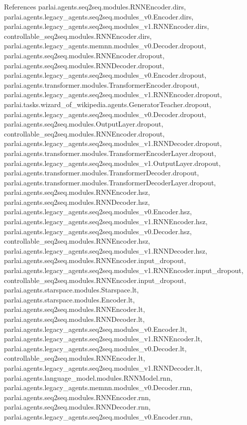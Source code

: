References parlai.\+agents.\+seq2seq.\+modules.\+R\+N\+N\+Encoder.\+dirs, parlai.\+agents.\+legacy\+\_\+agents.\+seq2seq.\+modules\+\_\+v0.\+Encoder.\+dirs, parlai.\+agents.\+legacy\+\_\+agents.\+seq2seq.\+modules\+\_\+v1.\+R\+N\+N\+Encoder.\+dirs, controllable\+\_\+seq2seq.\+modules.\+R\+N\+N\+Encoder.\+dirs, parlai.\+agents.\+legacy\+\_\+agents.\+memnn.\+modules\+\_\+v0.\+Decoder.\+dropout, parlai.\+agents.\+seq2seq.\+modules.\+R\+N\+N\+Encoder.\+dropout, parlai.\+agents.\+seq2seq.\+modules.\+R\+N\+N\+Decoder.\+dropout, parlai.\+agents.\+legacy\+\_\+agents.\+seq2seq.\+modules\+\_\+v0.\+Encoder.\+dropout, parlai.\+agents.\+transformer.\+modules.\+Transformer\+Encoder.\+dropout, parlai.\+agents.\+legacy\+\_\+agents.\+seq2seq.\+modules\+\_\+v1.\+R\+N\+N\+Encoder.\+dropout, parlai.\+tasks.\+wizard\+\_\+of\+\_\+wikipedia.\+agents.\+Generator\+Teacher.\+dropout, parlai.\+agents.\+legacy\+\_\+agents.\+seq2seq.\+modules\+\_\+v0.\+Decoder.\+dropout, parlai.\+agents.\+seq2seq.\+modules.\+Output\+Layer.\+dropout, controllable\+\_\+seq2seq.\+modules.\+R\+N\+N\+Encoder.\+dropout, parlai.\+agents.\+legacy\+\_\+agents.\+seq2seq.\+modules\+\_\+v1.\+R\+N\+N\+Decoder.\+dropout, parlai.\+agents.\+transformer.\+modules.\+Transformer\+Encoder\+Layer.\+dropout, parlai.\+agents.\+legacy\+\_\+agents.\+seq2seq.\+modules\+\_\+v1.\+Output\+Layer.\+dropout, parlai.\+agents.\+transformer.\+modules.\+Transformer\+Decoder.\+dropout, parlai.\+agents.\+transformer.\+modules.\+Transformer\+Decoder\+Layer.\+dropout, parlai.\+agents.\+seq2seq.\+modules.\+R\+N\+N\+Encoder.\+hsz, parlai.\+agents.\+seq2seq.\+modules.\+R\+N\+N\+Decoder.\+hsz, parlai.\+agents.\+legacy\+\_\+agents.\+seq2seq.\+modules\+\_\+v0.\+Encoder.\+hsz, parlai.\+agents.\+legacy\+\_\+agents.\+seq2seq.\+modules\+\_\+v1.\+R\+N\+N\+Encoder.\+hsz, parlai.\+agents.\+legacy\+\_\+agents.\+seq2seq.\+modules\+\_\+v0.\+Decoder.\+hsz, controllable\+\_\+seq2seq.\+modules.\+R\+N\+N\+Encoder.\+hsz, parlai.\+agents.\+legacy\+\_\+agents.\+seq2seq.\+modules\+\_\+v1.\+R\+N\+N\+Decoder.\+hsz, parlai.\+agents.\+seq2seq.\+modules.\+R\+N\+N\+Encoder.\+input\+\_\+dropout, parlai.\+agents.\+legacy\+\_\+agents.\+seq2seq.\+modules\+\_\+v1.\+R\+N\+N\+Encoder.\+input\+\_\+dropout, controllable\+\_\+seq2seq.\+modules.\+R\+N\+N\+Encoder.\+input\+\_\+dropout, parlai.\+agents.\+starspace.\+modules.\+Starspace.\+lt, parlai.\+agents.\+starspace.\+modules.\+Encoder.\+lt, parlai.\+agents.\+seq2seq.\+modules.\+R\+N\+N\+Encoder.\+lt, parlai.\+agents.\+seq2seq.\+modules.\+R\+N\+N\+Decoder.\+lt, parlai.\+agents.\+legacy\+\_\+agents.\+seq2seq.\+modules\+\_\+v0.\+Encoder.\+lt, parlai.\+agents.\+legacy\+\_\+agents.\+seq2seq.\+modules\+\_\+v1.\+R\+N\+N\+Encoder.\+lt, parlai.\+agents.\+legacy\+\_\+agents.\+seq2seq.\+modules\+\_\+v0.\+Decoder.\+lt, controllable\+\_\+seq2seq.\+modules.\+R\+N\+N\+Encoder.\+lt, parlai.\+agents.\+legacy\+\_\+agents.\+seq2seq.\+modules\+\_\+v1.\+R\+N\+N\+Decoder.\+lt, parlai.\+agents.\+language\+\_\+model.\+modules.\+R\+N\+N\+Model.\+rnn, parlai.\+agents.\+legacy\+\_\+agents.\+memnn.\+modules\+\_\+v0.\+Decoder.\+rnn, parlai.\+agents.\+seq2seq.\+modules.\+R\+N\+N\+Encoder.\+rnn, parlai.\+agents.\+seq2seq.\+modules.\+R\+N\+N\+Decoder.\+rnn, parlai.\+agents.\+legacy\+\_\+agents.\+seq2seq.\+modules\+\_\+v0.\+Encoder.\+rnn, 